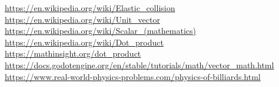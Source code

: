 \documentclass{amsart}
\begin{document}
\newpage

\begin{thebibliography}{9}
  \url{https://en.wikipedia.org/wiki/Elastic_collision}
  \url{https://en.wikipedia.org/wiki/Unit_vector}
  \url{https://en.wikipedia.org/wiki/Scalar_(mathematics)}
  \url{https://en.wikipedia.org/wiki/Dot_product}
  \url{https://mathinsight.org/dot_product}
  \url{https://docs.godotengine.org/en/stable/tutorials/math/vector_math.html}
  \url{https://www.real-world-physics-problems.com/physics-of-billiards.html}
\end{thebibliography}
\end{document}
